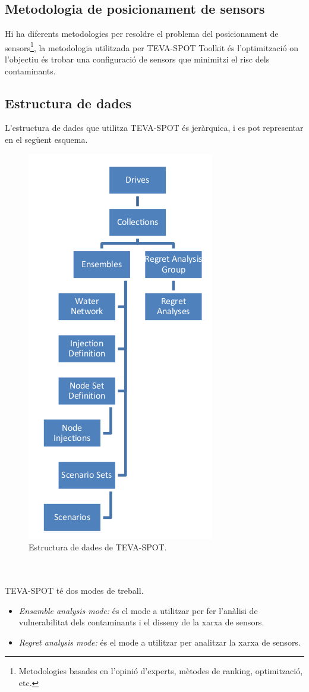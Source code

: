 \documentclass[12pt]{article}
\begin{document}
\subsection{Metodologia de posicionament de sensors}
Hi ha diferents metodologies per resoldre el problema del posicionament de sensors\footnote{Metodologies basades en l'opinió d'experts, mètodes de ranking, optimització, etc.}, la metodologia utilitzada per TEVA-SPOT Toolkit és l'optimització on l'objectiu és trobar una configuració de sensors que minimitzi el risc dels contaminants.

\subsection{Estructura de dades}
L'estructura de dades que utilitza TEVA-SPOT és jeràrquica, i es pot representar en el següent esquema.
\begin{figure}[h!]
	\centering
	\includegraphics[scale=.5]{imatges/teva-spot/esquema.png}
	\caption{Estructura de dades de TEVA-SPOT.}
\end{figure}
\\\\TEVA-SPOT té dos modes de treball.
\begin{itemize}
	\item \textit{Ensamble analysis mode:} és el mode a utilitzar per fer l'anàlisi de vulnerabilitat dels contaminants i el disseny de la xarxa de sensors.
	\item \textit{Regret analysis mode:} és el mode a utilitzar per analitzar la xarxa de sensors. 
\end{itemize}
\end{document}
